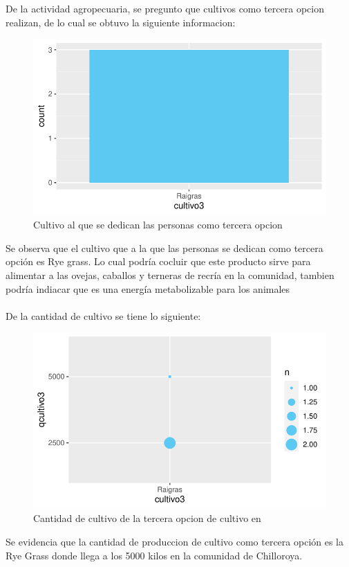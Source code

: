 \documentclass[12pt]{article}\usepackage[]{graphicx}\usepackage[]{xcolor}
\makeatletter
\def\maxwidth{ %
  \ifdim\Gin@nat@width>\linewidth
    \linewidth
  \else
    \Gin@nat@width
  \fi
}
\newenvironment{knitrout}{}{} %
\makeatother
\begin{document}
	De la actividad agropecuaria, se pregunto que cultivos como tercera opcion realizan, de lo cual se obtuvo la siguiente informacion:
	\begin{figure}[H]
	\centering
\begin{knitrout}
\color{fgcolor}
\includegraphics[width=\maxwidth]{figure/thirteen-1} 
\end{knitrout}
	\caption{Cultivo al que se dedican las personas como tercera opcion}
	\end{figure}
	Se observa que el cultivo que a la que las personas se dedican como tercera opción es Rye grass. Lo cual podría cocluir que este producto sirve para alimentar a las ovejas, caballos y terneras de recría en la comunidad, tambien podría indiacar que es una energía metabolizable para los animales\\
	\\
	De la cantidad de cultivo se tiene lo siguiente:
	\begin{figure}[H]
	\centering
\begin{knitrout}
\color{fgcolor}
\includegraphics[width=\maxwidth]{figure/fourteen-1} 
\end{knitrout}
	\caption{Cantidad de cultivo de la tercera opcion de cultivo en \comunidad}
	\end{figure}
	Se evidencia que la cantidad  de produccion de cultivo como tercera opción es la Rye Grass donde llega a los 5000 kilos en la comunidad de Chilloroya.\\
	\\
	
\end{document}
